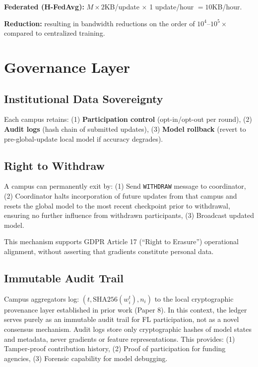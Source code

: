 \documentclass[conference]{IEEEtran}
\begin{document}
\textbf{Federated (H-FedAvg):} $M \times 2$KB/update $\times$ 1 update/hour $= 10$KB/hour.

\textbf{Reduction:} resulting in bandwidth reductions on the order of $10^4$--$10^5\times$ compared to centralized training.

\section{Governance Layer}

\subsection{Institutional Data Sovereignty}

Each campus retains: (1) \textbf{Participation control} (opt-in/opt-out per round), (2) \textbf{Audit logs} (hash chain of submitted updates), (3) \textbf{Model rollback} (revert to pre-global-update local model if accuracy degrades).

\subsection{Right to Withdraw}

A campus can permanently exit by: (1) Send \texttt{WITHDRAW} message to coordinator, (2) Coordinator halts incorporation of future updates from that campus and resets the global model to the most recent checkpoint prior to withdrawal, ensuring no further influence from withdrawn participants, (3) Broadcast updated model.

This mechanism supports GDPR Article 17 (``Right to Erasure'') operational alignment, without asserting that gradients constitute personal data.

\subsection{Immutable Audit Trail}

Campus aggregators log: $(t, \text{SHA256}(w_i^t), n_i)$ to the local cryptographic provenance layer established in prior work (Paper 8). In this context, the ledger serves purely as an immutable audit trail for FL participation, not as a novel consensus mechanism. Audit logs store only cryptographic hashes of model states and metadata, never gradients or feature representations. This provides: (1) Tamper-proof contribution history, (2) Proof of participation for funding agencies, (3) Forensic capability for model debugging.
\end{document}
